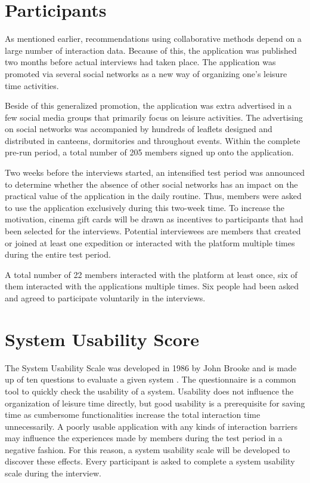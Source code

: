 \documentclass[12pt,numbers=noenddot,parskip,bibliography=totocnumbered,listof=totocnumbered,draft]{scrreprt}
\begin{document}
\section{Participants}
As mentioned earlier, recommendations using collaborative methods depend on a large number of interaction data. Because of this, the application was published two months before actual interviews had taken place. The application was promoted via several social networks as a new way of organizing one's leisure time activities.

Beside of this generalized promotion, the application was extra advertised in a few social media groups that primarily focus on leisure activities. The advertising on social networks was accompanied by hundreds of leaflets designed and distributed in canteens, dormitories and throughout events. Within the complete pre-run period, a total number of 205 members signed up onto the application. 

Two weeks before the interviews started, an intensified test period was announced to determine whether the absence of other social networks has an impact on the practical value of the application in the daily routine. Thus, members were asked to use the application exclusively during this two-week time. To increase the motivation, cinema gift cards will be drawn as incentives to participants that had been selected for the interviews. Potential interviewees are members that created or joined at least one expedition or interacted with the platform multiple times during the entire test period. 

A total number of 22 members interacted with the platform at least once, six of them interacted with the applications multiple times. Six people had been asked and agreed to participate voluntarily in the interviews.

\section{System Usability Score}
The System Usability Scale was developed in 1986 by John Brooke and is made up of ten questions to evaluate a given system \citep[p.189-194]{brooke1996}. The questionnaire is a common tool to quickly check the usability of a system. Usability does not influence the organization of leisure time directly, but good usability is a prerequisite for saving time as cumbersome functionalities increase the total interaction time unnecessarily. A poorly usable application with any kinds of interaction barriers may influence the experiences made by members during the test period in a negative fashion. For this reason, a system usability scale will be developed to discover these effects. Every participant is asked to complete a system usability scale during the interview.
\end{document}
